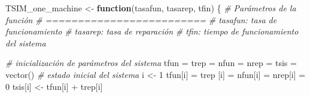 \documentclass[
]{book}
\newenvironment{Shaded}{\begin{snugshade}}{\end{snugshade}}
\newcommand{\CommentTok}[1]{\textcolor[rgb]{0.56,0.35,0.01}{\textit{#1}}}
\newcommand{\ControlFlowTok}[1]{\textcolor[rgb]{0.13,0.29,0.53}{\textbf{#1}}}
\newcommand{\DecValTok}[1]{\textcolor[rgb]{0.00,0.00,0.81}{#1}}
\newcommand{\FunctionTok}[1]{\textcolor[rgb]{0.00,0.00,0.00}{#1}}
\newcommand{\NormalTok}[1]{#1}
\newcommand{\OtherTok}[1]{\textcolor[rgb]{0.56,0.35,0.01}{#1}}
\newcommand{\SpecialCharTok}[1]{\textcolor[rgb]{0.00,0.00,0.00}{#1}}
\theoremstyle{definition}
\theoremstyle{definition}
\theoremstyle{definition}
\theoremstyle{definition}
\theoremstyle{remark}
\begin{document}
\begin{Shaded}
\begin{Highlighting}[]
\NormalTok{TSIM\_one\_machine }\OtherTok{\textless{}{-}} \ControlFlowTok{function}\NormalTok{(tasafun, tasarep, tfin)}
\NormalTok{\{}
  \CommentTok{\# Parámetros de la función}
  \CommentTok{\# =========================}
  \CommentTok{\# tasafun: tasa de funcionamiento}
  \CommentTok{\# tasarep: tasa de reparación}
  \CommentTok{\# tfin: tiempo de funcionamiento del sistema}
  
  \CommentTok{\# inicialización de parámetros del sistema }
\NormalTok{  tfun }\OtherTok{=}\NormalTok{ trep }\OtherTok{=}\NormalTok{ nfun }\OtherTok{=}\NormalTok{ nrep }\OtherTok{=}\NormalTok{ tsis }\OtherTok{=} \FunctionTok{vector}\NormalTok{()}
  \CommentTok{\# estado inicial del sistema}
\NormalTok{  i }\OtherTok{\textless{}{-}} \DecValTok{1}
\NormalTok{  tfun[i] }\OtherTok{=}\NormalTok{ trep [i] }\OtherTok{=}\NormalTok{ nfun[i] }\OtherTok{=}\NormalTok{ nrep[i] }\OtherTok{=} \DecValTok{0}
\NormalTok{  tsis[i] }\OtherTok{\textless{}{-}}\NormalTok{ tfun[i] }\SpecialCharTok{+}\NormalTok{ trep[i]}
  

\end{Highlighting}
\end{Shaded}
\end{document}
